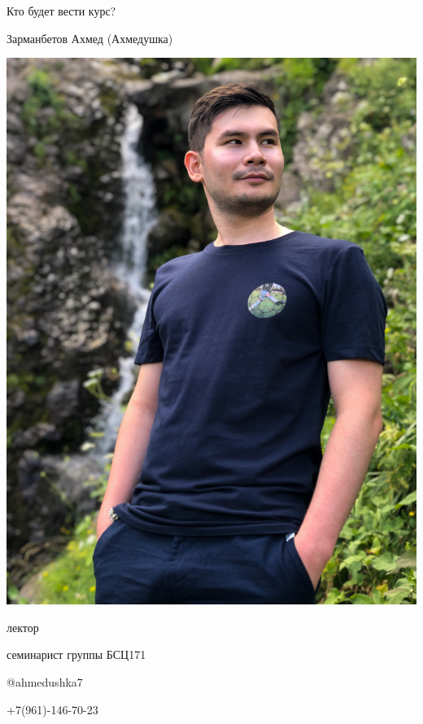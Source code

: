 \documentclass[notes,12pt, aspectratio=169]{beamer}
\newenvironment{wideitemize}{\itemize\addtolength{\itemsep}{10pt}}{\enditemize}
\begin{document}
\begin{frame}{Кто будет вести курс?}
	\begin{minipage}{0.45\textwidth}
		\centering Зарманбетов Ахмед (Ахмедушка)
		
		\centering \includegraphics[scale = 0.2]{ahmed.jpg}
	\end{minipage}
	\hfill
	\begin{minipage}{0.45\textwidth}
		\begin{wideitemize}
			
			\item лектор 
			
			\item семинарист группы БСЦ171
			
			\item \faTelegram \: @ahmedushka7
			
			\item \PhoneHandset \: +7(961)-146-70-23
			
		\end{wideitemize} 
	\end{minipage}
\end{frame}
\end{document}
